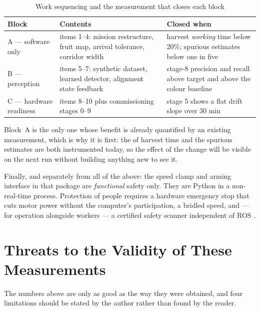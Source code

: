 \documentclass[conference]{IEEEtran}
\begin{document}
\begin{table}[!t]
\caption{Work sequencing and the measurement that closes each block}
\label{tab:schedule}
\centering\footnotesize
\begin{tabular}{@{}lp{}p{}@{}}
\toprule
\textbf{Block} & \textbf{Contents} & \textbf{Closed when}\\
\midrule
A --- software only
  & items 1--4: mission restructure, fruit map, arrival tolerance, corridor width
  & harvest \emph{working} time below 20\%; spurious estimates below one in five\\
\addlinespace
B --- perception
  & items 5--7: synthetic dataset, learned detector, alignment state feedback
  & stage-8 precision and recall above target and above the colour baseline\\
\addlinespace
C --- hardware readiness
  & items 8--10 plus commissioning stages 0--9
  & stage 5 shows a flat drift slope over 30 min\\
\bottomrule
\end{tabular}
\end{table}

Block~A is the only one whose benefit is already quantified by an existing
measurement, which is why it is first: the  of harvest time and
the  spurious estimates are both instrumented today, so
the effect of the change will be visible on the next run without building
anything new to see it.

Finally, and separately from all of the above: the speed clamp and arming
interface in that package are \emph{functional} safety only. They are Python
in a non-real-time process. Protection of people requires a hardware emergency
stop that cuts motor power without the computer's participation, a bridled
speed, and --- for operation alongside workers --- a certified safety scanner
independent of ROS \cite{iso36914}.

\section{Threats to the Validity of These Measurements}

The numbers above are only as good as the way they were obtained, and four
limitations should be stated by the author rather than found by the reader.
\end{document}
